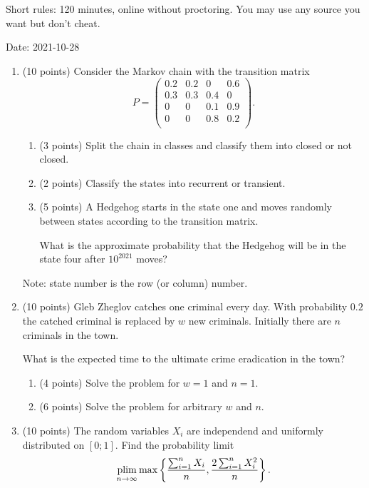 Short rules: 120 minutes, online without proctoring. You may use any source you want but don't cheat.

Date: 2021-10-28

\begin{enumerate}

\item (10 points) Consider the Markov chain with the transition matrix
\[
  P = \begin{pmatrix}
    0.2 & 0.2 & 0 & 0.6 \\
    0.3 & 0.3 & 0.4 & 0 \\
    0 & 0 & 0.1 & 0.9 \\
    0 & 0 & 0.8 & 0.2 \\
  \end{pmatrix}.
\]

\begin{enumerate}
  \item (3 points) Split the chain in classes and classify them into closed or not closed.
  \item (2 points) Classify the states into recurrent or transient.
  \item (5 points) A Hedgehog starts in the state one and moves 
  randomly between states according to the transition matrix.

  What is the approximate probability that the Hedgehog will be in the 
  state four after $10^{2021}$ moves?
\end{enumerate}

Note: state number is the row (or column) number.

  \item (10 points) Gleb Zheglov catches one criminal every day. 
  With probability $0.2$ the catched criminal is replaced by $w$ new criminals. 
  Initially there are $n$ criminals in the town. 

  What is the expected time to the ultimate crime eradication in the town?

  \begin{enumerate}
    \item (4 points) Solve the problem for $w=1$ and $n=1$.
    \item (6 points) Solve the problem for arbitrary $w$ and $n$.
  \end{enumerate}

  \item %
  (10 points) The random variables $X_i$ are independend and uniformly distributed on $[0;1]$.
  Find the probability limit
\[
\operatorname*{plim}_{n\to\infty}  \max \left\{ \frac{\sum_{i=1}^n X_i}{n}, \frac{2\sum_{i=1}^n X^2_i}{n} \right\}.
\]




\end{enumerate}
